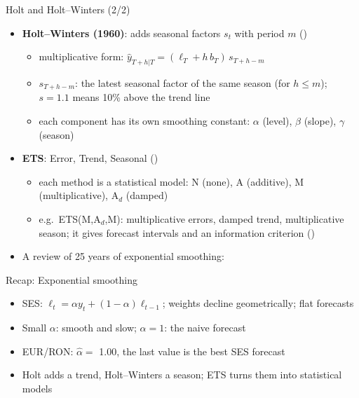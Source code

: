 \begin{frame}{Holt and Holt--Winters (2/2)}
\itemsize{\footnotesize}
\begin{itemize}
    \item \textbf{Holt--Winters (1960)}: adds seasonal factors $s_t$ with period $m$ ()
    \begin{itemize}
        \item multiplicative form: $\hat y_{T+h|T} = (\ell_T + h\, b_T)\, s_{T+h-m}$
        \item $s_{T+h-m}$: the latest seasonal factor of the same season (for $h \le m$); $s = 1.1$ means 10\% above the trend line
        \item each component has its own smoothing constant: $\alpha$ (level), $\beta$ (slope), $\gamma$ (season)
    \end{itemize}
    \item \textbf{ETS}: Error, Trend, Seasonal ()
    \begin{itemize}
        \item each method is a statistical model: N (none), A (additive), M (multiplicative), A$_d$ (damped)
        \item e.g.\ ETS(M,A$_d$,M): multiplicative errors, damped trend, multiplicative season; it gives forecast intervals and an information criterion ()
    \end{itemize}
    \item A review of 25 years of exponential smoothing: 
\end{itemize}
\end{frame}

\begin{frame}{Recap: Exponential smoothing}
\itemsize{\small}
\begin{itemize}
    \item SES: $\ell_t = \alpha y_t + (1-\alpha)\ell_{t-1}$; weights decline geometrically; flat forecasts
    \item Small $\alpha$: smooth and slow; $\alpha = 1$: the naive forecast
    \item EUR/RON: $\hat\alpha = $ 1.00, the last value is the best SES forecast
    \item Holt adds a trend, Holt--Winters a season; ETS turns them into statistical models
\end{itemize}
\end{frame}


